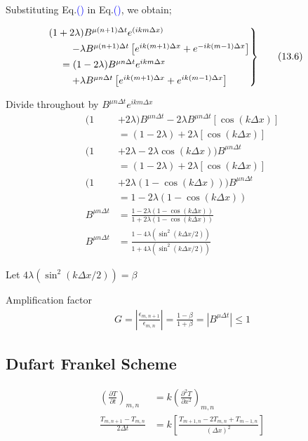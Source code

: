 \documentclass[fleqn,10pt]{SelfArx} %
\newcommand{\myeqref}[1]{Eq.\textcolor{blue}{\textup{(\getrefnumber{#1})}}}
\begin{document}
Substituting \myeqref{eq:13.5} in \myeqref{eq:13.4}, we obtain;

\begin{align*}
	\begin{rcases}
	&\mspace{-25mu} (1 + 2\lambda)B^{\mu (n+1)\Delta t}e^{(ikm\Delta x)} \\ & \quad - \lambda B^{\mu (n+1) \Delta t}\left[e^{ik (m+1) \Delta x} + e^{-ik (m-1) \Delta x}\right] \\ &= (1 - 2\lambda)B^{\mu n\Delta t}e^{ikm\Delta x} \\ & \quad + \lambda B^{\mu n\Delta t}\left[e^{ik (m+1) \Delta x} + e^{ik (m-1) \Delta x}\right]
	\end{rcases} & \tag{13.6} \label{eq:13.6}
\end{align*}

Divide throughout by $B^{\mu n \Delta t} e^{ikm\Delta x}$
\begin{align*}
	(1 &+ 2\lambda)B^{\mu n\Delta t} - 2\lambda B^{\mu n \Delta t}\left[\cos(k \Delta x)\right] \\ &= (1 - 2\lambda) + 2\lambda \left[\cos(k \Delta x)\right] \\
	(1 &+ 2\lambda - 2\lambda \cos(k \Delta x))B^{\mu n\Delta t} \\ &= (1 - 2\lambda) + 2\lambda \left[\cos(k \Delta x)\right] \\
	(1 &+ 2\lambda(1 - \cos(k \Delta x)))B^{\mu n\Delta t} \\ &= 1 - 2\lambda(1 - \cos(k \Delta x)) \\
	B^{\mu n\Delta t} &= \frac{1 - 2\lambda(1 - \cos(k \Delta x))}{1 + 2\lambda(1 - \cos(k \Delta x))} \\
	B^{\mu n\Delta t} &= \frac{1 - 4\lambda(\sin^2(k \Delta x/2))}{1 + 4\lambda(\sin^2(k \Delta x/2))} \tag{13.7} \label{eq:13.7}
\end{align*}

Let $4\lambda(\sin^2(k \Delta x/2)) = \beta$

Amplification factor
\begin{align*}
	G = \left|\frac{\epsilon_{m,n+1}}{\epsilon_{m,n}}\right| = \frac{1-\beta}{1+ \beta} = \left|B^{\mu \Delta t}\right| \leq 1 \tag{13.8} \label{eq:13.8}
\end{align*}

\subsection{Dufart Frankel Scheme}
\begin{align*}
	\left(\frac{\partial T}{\partial t}\right)_{m,n} &= k\left(\frac{\partial^2 T}{\partial x^2}\right)_{m,n} \tag{13.9} \label{eq:13.9} \\
	\frac{T_{m,n+1} - T_{m,n}}{2\Delta t} &= k\left[\frac{T_{m+1,n} - 2T_{m,n} + T_{m-1,n}}{(\Delta x)^2}\right] \tag{13.10} \label{eq:13.10}
\end{align*}
\end{document}
